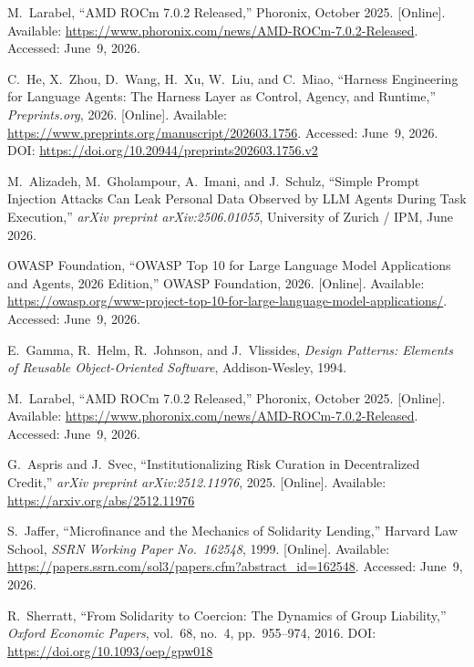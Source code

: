 \documentclass[12pt,a4paper]{report}
\begin{document}
{\begin{enumerate}[label={[\arabic*]}]
\item M.~Larabel, ``AMD ROCm 7.0.2 Released,'' Phoronix, October 2025. [Online]. Available: \url{https://www.phoronix.com/news/AMD-ROCm-7.0.2-Released}. Accessed: June~9, 2026.
\item C.~He, X.~Zhou, D.~Wang, H.~Xu, W.~Liu, and C.~Miao, ``Harness Engineering for Language Agents: The Harness Layer as Control, Agency, and Runtime,'' \textit{Preprints.org}, 2026. [Online]. Available: \url{https://www.preprints.org/manuscript/202603.1756}. Accessed: June~9, 2026. DOI: \url{https://doi.org/10.20944/preprints202603.1756.v2}
\item M.~Alizadeh, M.~Gholampour, A.~Imani, and J.~Schulz, ``Simple Prompt
Injection Attacks Can Leak Personal Data Observed by LLM Agents During Task
Execution,'' \textit{arXiv preprint arXiv:2506.01055}, University of Zurich / IPM,
June 2026.

\item OWASP Foundation, ``OWASP Top 10 for Large Language Model Applications and
Agents, 2026 Edition,'' OWASP Foundation, 2026. [Online]. Available:
\url{https://owasp.org/www-project-top-10-for-large-language-model-applications/}. Accessed: June~9, 2026.

\item E.~Gamma, R.~Helm, R.~Johnson, and J.~Vlissides, \textit{Design Patterns:
Elements of Reusable Object-Oriented Software}, Addison-Wesley, 1994.

\item M.~Larabel, ``AMD ROCm 7.0.2 Released,'' Phoronix, October 2025. [Online]. Available: \url{https://www.phoronix.com/news/AMD-ROCm-7.0.2-Released}. Accessed: June~9, 2026.
\item G.~Aspris and J.~Svec, ``Institutionalizing Risk Curation in Decentralized Credit,'' \textit{arXiv preprint arXiv:2512.11976}, 2025. [Online]. Available: \url{https://arxiv.org/abs/2512.11976}

\item S.~Jaffer, ``Microfinance and the Mechanics of Solidarity Lending,'' Harvard Law School, \textit{SSRN Working Paper No.~162548}, 1999. [Online]. Available: \url{https://papers.ssrn.com/sol3/papers.cfm?abstract_id=162548}. Accessed: June~9, 2026.

\item R.~Sherratt, ``From Solidarity to Coercion: The Dynamics of Group Liability,'' \textit{Oxford Economic Papers}, vol.~68, no.~4, pp.~955--974, 2016. DOI: \url{https://doi.org/10.1093/oep/gpw018}


\end{enumerate}}
\end{document}
